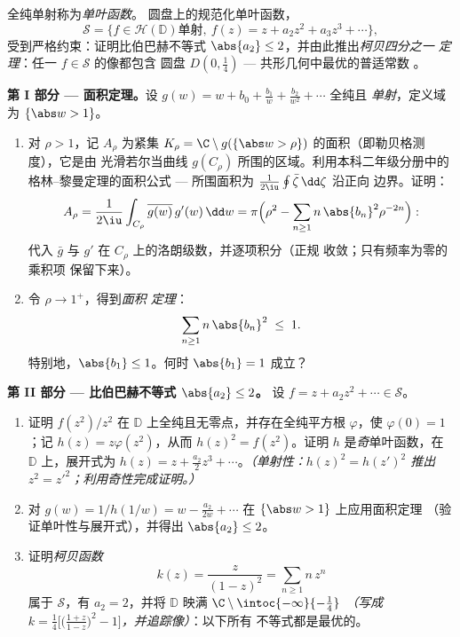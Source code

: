 \begin{problem}\label{pb:b3:conformal:1}
全纯单射称为\emph{单叶函数}。
圆盘上的规范化单叶函数，
\[
\mathcal S = \bigl\{f \in \mathcal H(\mathbb D) \text{
单射},\ f(z) = z + a_2z^2 + a_3z^3 + \cdots\bigr\},
\]
受到严格约束：证明比伯巴赫不等式
$\abs{a_2} \leq 2$，并由此推出\emph{柯贝四分之一
定理}：任一 $f \in \mathcal S$ 的像都包含
圆盘 $D(0, \frac14)$ --- 共形几何中最优的普适常数
。

\medskip
\noindent\textbf{第 I 部分 --- 面积定理。}设 $g(w) = w
+ b_0 + \frac{b_1}w + \frac{b_2}{w^2} + \cdots$ 全纯且
\emph{单射}，定义域为 $\{\abs w > 1\}$。
\begin{enumerate}
  \item 对 $\rho > 1$，记 $A_\rho$ 为紧集
        $K_\rho = \C\setminus
        g(\{\abs w > \rho\})$ 的面积（即勒贝格测度），它是由
        光滑若尔当曲线 $g(C_\rho)$ 所围的区域。利用本科二年级分册中的
        格林–黎曼定理的面积公式
        --- 所围面积为 $\frac1{2\iu}
        \oint\bar\zeta\,\dd\zeta$ 沿正向
        边界。证明：
        \[
        A_\rho = \frac{1}{2\iu}\int_{C_\rho}
        \overline{g(w)}\,g'(w)\,\dd w
        = \pi\Bigl(\rho^2 -
        \sum_{n\geq1}n\,\abs{b_n}^2\rho^{-2n}\Bigr) :
        \]
        代入 $\bar g$ 与 $g'$ 在
        $C_\rho$ 上的洛朗级数，并逐项积分（正规
        收敛；只有频率为零的乘积项
        保留下来）。
  \item 令 $\rho \to 1^+$，得到\emph{面积
        定理}：
        \[
        \sum_{n\geq1}n\,\abs{b_n}^2 \;\leq\; 1 .
        \]
        特别地，$\abs{b_1} \leq 1$。何时 $\abs{b_1}
        = 1$ 成立？
\end{enumerate}

\medskip
\noindent\textbf{第 II 部分 --- 比伯巴赫不等式 $\abs{a_2} \leq
2$。} 设 $f = z + a_2z^2 + \cdots \in \mathcal S$。
\begin{enumerate}[resume]
  \item 证明 $f(z^2)/z^2$ 在
        $\mathbb D$ 上全纯且无零点，并存在全纯平方根
        $\varphi$，使 $\varphi(0) = 1$；记 $h(z) =
        z\varphi(z^2)$，从而 $h(z)^2 = f(z^2)$。证明
        $h$ 是\emph{奇}单叶函数，在 $\mathbb
        D$ 上，展开式为 $h(z) = z + \frac{a_2}2z^3 +
        \cdots$。\emph{（单射性：$h(z)^2 = h(z')^2$
        推出 $z^2 = z'^2$；利用奇性完成证明。）}
  \item 对 $g(w) = 1/h(1/w) = w -
        \frac{a_2}{2w} + \cdots$ 在 $\{\abs w > 1\}$ 上应用面积定理
        （验证单叶性与展开式），并得出
        $\abs{a_2} \leq 2$。
  \item 证明\emph{柯贝函数}
        \[
        k(z) = \frac{z}{(1 - z)^2} = \sum_{n\geq1}n\,z^n
        \]
        属于 $\mathcal S$，有 $a_2 = 2$，并将
        $\mathbb D$ 映满 $\C\setminus\intoc{-\infty}{-\frac14}$
        \emph{（写成 $k = \frac14\bigl[\bigl(\frac{1+z}{1 -
        z}\bigr)^2 - 1\bigr]$，并追踪像）}：以下所有
        不等式都是最优的。
\end{enumerate}


\end{problem}
